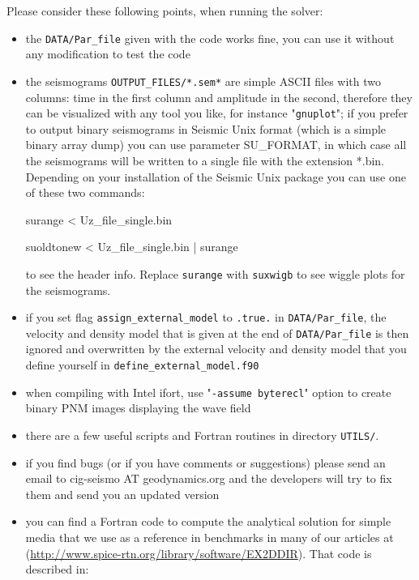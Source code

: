 \documentclass[oneside,english,onecolumn,letterpaper]{book}
\newcommand{\urlwithparentheses}[1]{(\url{#1})}
\begin{document}
\noindent
Please consider these following points, when running the solver:
\begin{itemize}
\item the \texttt{DATA/Par\_file} given with the code works fine, you can use it without any modification to test the code

\item the seismograms \texttt{OUTPUT\_FILES/*.sem*} are simple ASCII files with two columns: time in the first column and amplitude in the second, therefore they can be visualized with any tool you like, for instance "\texttt{gnuplot}"; if you prefer to output binary seismograms in Seismic Unix format (which is a simple binary array dump) you can use parameter SU\_FORMAT, in which case all the seismograms will be written to a single file with the extension *.bin.
Depending on your installation of the Seismic Unix package you can use one of these two commands:

surange < Uz\_file\_single.bin

suoldtonew < Uz\_file\_single.bin | surange

to see the header info.
Replace \texttt{surange} with \texttt{suxwigb} to see wiggle plots for the seismograms.

\item if you set flag \texttt{assign\_external\_model} to \texttt{.true.} in \texttt{DATA/Par\_file}, the velocity and density model that is given at the end of \texttt{DATA/Par\_file} is then ignored and overwritten by the external velocity and density model that you define yourself in \texttt{define\_external\_model.f90}

\item when compiling with Intel ifort, use "\texttt{-assume byterecl}" option to create binary PNM images displaying the wave field

\item there are a few useful scripts and Fortran routines in directory \texttt{UTILS/}.

\item if you find bugs (or if you have comments or suggestions) please send an email to cig-seismo AT geodynamics.org and the developers will try to fix them and send you an updated version

\item you can find a Fortran code to compute the analytical solution for simple media that we use as a reference in benchmarks in many of our articles at
\urlwithparentheses{http://www.spice-rtn.org/library/software/EX2DDIR}. That code is described in: \cite{BeIfNiSk94}

\end{itemize}
\end{document}
